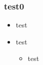 \documentclass[14pt,t]{beamer}
\begin{document}
\begin{frame}
\maketitle
\end{frame}
\begin{frame}
\frametitle{test0}
\begin{itemize}
\item test
\item test
\begin{itemize}
\item test
\end{itemize}
\end{itemize}
\end{frame}
\end{document}
